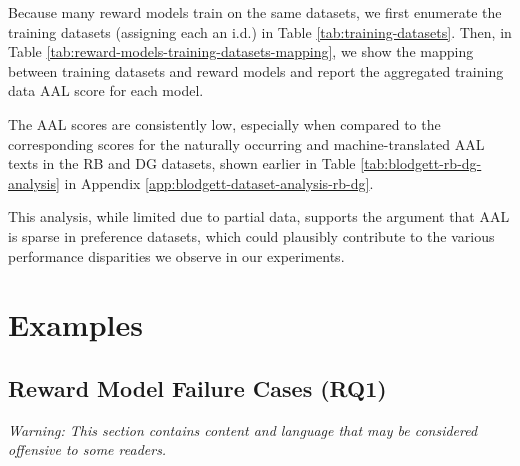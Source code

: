 Because many reward models train on the same datasets, we first enumerate the training datasets (assigning each an i.d.) in Table \ref{tab:training-datasets}. Then, in Table \ref{tab:reward-models-training-datasets-mapping}, we show the mapping between training datasets and reward models and report the aggregated training data AAL score for each model. 

The AAL scores are consistently low, especially when compared to the corresponding scores for the naturally occurring and machine-translated AAL texts in the \textsc{RB} and \textsc{DG} datasets, shown earlier in Table \ref{tab:blodgett-rb-dg-analysis} in Appendix \ref{app:blodgett-dataset-analysis-rb-dg}.

This analysis, while limited due to partial data, supports the argument that AAL is sparse in preference datasets, which could plausibly contribute to the various performance disparities we observe in our experiments.

\section{Examples}
\subsection{Reward Model Failure Cases (RQ1)}
\label{app:rq1-failure-cases}
\textit{Warning: This section contains content and language that may be considered offensive to some readers.}


